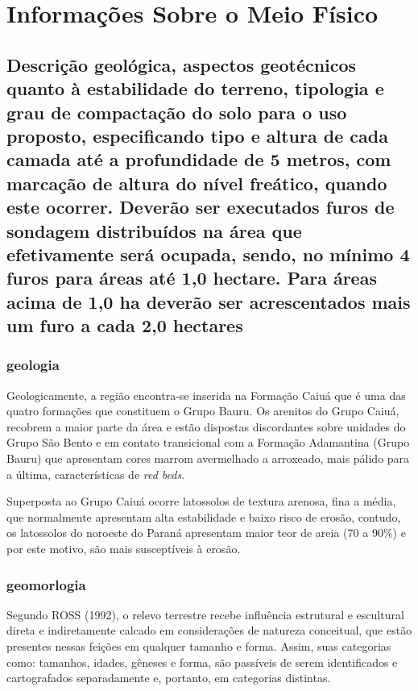 \section{Informações Sobre o Meio Físico}

\subsection{Descrição geológica, aspectos geotécnicos quanto à estabilidade do terreno, tipologia e grau de compactação do solo para o uso proposto, especificando tipo e altura de cada camada até a profundidade de 5 metros, com marcação de altura do nível freático, quando este ocorrer. Deverão ser executados furos de sondagem distribuídos na área que efetivamente será ocupada, sendo, no mínimo 4 furos para áreas até 1,0 hectare. Para áreas acima de 1,0 ha deverão ser acrescentados mais um furo a cada 2,0 hectares}

\subsubsection{geologia}
Geologicamente, a região encontra-se inserida na Formação Caiuá que é uma das quatro formações que constituem o Grupo Bauru. Os arenitos do Grupo Caiuá, recobrem a maior parte da área e estão dispostas discordantes sobre unidades do Grupo São Bento e em contato transicional com a Formação Adamantina (Grupo Bauru) que apresentam cores marrom avermelhado a arroxeado, mais pálido para a última, características de \textit{red beds}.

Superposta ao Grupo Caiuá ocorre latossolos de textura arenosa, fina a média, que normalmente apresentam alta estabilidade e baixo risco de erosão, contudo, os latossolos do noroeste do Paraná apresentam maior teor de areia (70 a 90\%) e por este motivo, são mais susceptíveis à erosão.

\subsubsection{geomorlogia}

Segundo ROSS (1992), o relevo terrestre recebe influência estrutural e escultural direta e  indiretamente calcado em considerações de natureza  conceitual, que estão presentes nessas feições em qualquer tamanho e forma. Assim, suas categorias como: tamanhos, idades, gêneses e forma, são passíveis de serem identificados e cartografados separadamente e, portanto, em categorias distintas.

